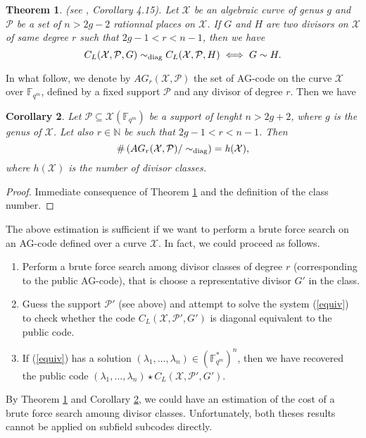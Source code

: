 \documentclass[10pt]{article}
\newtheorem{thm}{Theorem}
\newtheorem{coro1}[thm]{Corollary}
\newcommand{\s}{\vspace{0.3cm}}
\newcommand{\N}{\mathbb{N}}
\newcommand{\fqm}{\mathbb{F}_{q^m}}
\newcommand{\su}{\subseteq}
\newcommand{\X}{\mathcal{X}}
\newcommand{\PR}{\mathcal{P}}
\begin{document}
\s

\begin{thm} \label{thmequiv} \rm (see \cite{CMRP}, Corollary 4.15). \it
Let $\X$ be an algebraic curve of genus $g$ and $\PR$ be a set of $n>2g-2$ rationnal places on $\X$. If $G$ and $H$ are two divisors on $\X$ of same degree $r$ such that $2g-1 < r < n-1$, then we have 
\[C_L(\X,\PR,G) \sim_{\rm diag} C_L(\X,\PR,H) \iff G \sim H.\]
\end{thm}

\s

In what follow, we denote by $AG_r(\X,\PR)$ the set of AG-code on the curve $\X$ over $\fqm$, defined by a fixed support $\PR$ and any divisor of degree $r$. Then we have 

\s

\begin{coro1} \label{nbAGr}
Let $\PR \su \X(\fqm)$ be a support of lenght $n > 2g+2$, where $g$ is the genus of $\X$. Let also $r \in \N$ be such that $2g-1 < r < n-1$. Then 
\[ \#\left(AG_r(\X,\PR)/ \sim_{\rm diag}\right) \it = h(\X),\]
where $h(\X)$ is the number of divisor classes.
\end{coro1}

\s

\begin{proof}
Immediate consequence of Theorem \ref{thmequiv} and the definition of the class number.
\end{proof}

\s

The above estimation is sufficient if we want to perform a brute force search on an AG-code defined over a curve $\X$. In fact, we could proceed as follows.
\begin{enumerate}
\item Perform a brute force search among divisor classes of degree $r$ (corresponding to the public AG-code), that is choose a representative divisor $G'$ in the class.
\item Guess the support $\PR'$ (see above) and attempt to solve the system (\ref{equiv}) to check whether the code $C_L(\X,\PR',G')$ is diagonal equivalent to the public code.
\item If (\ref{equiv}) has a solution $(\lambda_1,...,\lambda_n) \in (\fqm^*)^n$, then we have recovered the public code $(\lambda_1,...,\lambda_n) \star C_L(\X,\PR',G')$.
\end{enumerate}

By Theorem \ref{thmequiv} and Corollary \ref{nbAGr}, we could have an estimation of the cost of a brute force search amoung divisor classes. Unfortunately, both theses results cannot be applied on subfield subcodes directly.
\end{document}

